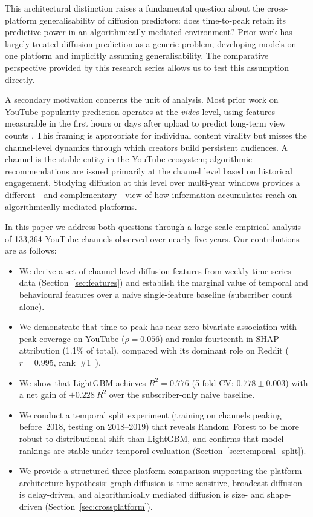\documentclass[journal,article,submit,pdftex,moreauthors]{Definitions/mdpi}
\begin{document}
This architectural distinction raises a fundamental question about the
cross-platform generalisability of diffusion predictors: does time-to-peak
retain its predictive power in an algorithmically mediated environment?
Prior work has largely treated diffusion prediction as a generic problem,
developing models on one platform and implicitly assuming generalisability.
The comparative perspective provided by this research series allows us to
test this assumption directly.

A secondary motivation concerns the unit of analysis.
Most prior work on YouTube popularity prediction operates at the
\emph{video} level, using features measurable in the first hours or days
after upload to predict long-term view counts
\cite{ref-szabo2010,ref-pinto2013,ref-chen2019,ref-figueiredo2016}.
This framing is appropriate for individual content virality but misses
the channel-level dynamics through which creators build persistent audiences.
A channel is the stable entity in the YouTube ecosystem; algorithmic
recommendations are issued primarily at the channel level based on
historical engagement.
Studying diffusion at this level over multi-year windows provides a
different---and complementary---view of how information accumulates reach
on algorithmically mediated platforms.

In this paper we address both questions through a large-scale empirical
analysis of 133,364 YouTube channels observed over nearly five years.
Our contributions are as follows:

\begin{itemize}
\item We derive a set of channel-level diffusion features from weekly
      time-series data (Section~\ref{sec:features}) and establish the
      marginal value of temporal and behavioural features over a naive
      single-feature baseline (subscriber count alone).
\item We demonstrate that time-to-peak has near-zero bivariate association
      with peak coverage on YouTube ($\rho = 0.056$) and ranks fourteenth
      in SHAP attribution (1.1\% of total), compared with its dominant
      role on Reddit ($r = 0.995$, rank~\#1~\cite{ref-paper1}).
\item We show that LightGBM achieves $R^2 = 0.776$ (5-fold CV:
      $0.778 \pm 0.003$) with a net gain of $+0.228~R^2$ over the
      subscriber-only naive baseline.
\item We conduct a temporal split experiment (training on channels peaking
      before~2018, testing on 2018--2019) that reveals Random~Forest to be
      more robust to distributional shift than LightGBM, and confirms that
      model rankings are stable under temporal evaluation
      (Section~\ref{sec:temporal_split}).
\item We provide a structured three-platform comparison supporting the
      platform architecture hypothesis: graph diffusion is time-sensitive,
      broadcast diffusion is delay-driven, and algorithmically mediated
      diffusion is size- and shape-driven (Section~\ref{sec:crossplatform}).
\end{itemize}
\end{document}
